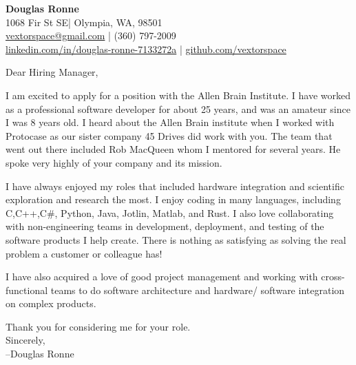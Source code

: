 \documentclass[letter,12pt]{article}
\begin{document}
\begin{center}
    {\Huge \textbf{Douglas Ronne}}\\
    \vspace{2mm}
    1068 Fir St SE| Olympia, WA, 98501\\
    \href{mailto:vextorspace@gmail.com}{vextorspace@gmail.com} | (360) 797-2009\\
    \href{www.linkedin.com/in/douglas-ronne-7133272a}{linkedin.com/in/douglas-ronne-7133272a} | \href{https://github.com/vextorspace}{github.com/vextorspace}
\end{center}

Dear Hiring Manager,

I am excited to apply for a position with the Allen Brain Institute. I have worked as a professional software developer for about 25 years, and was an amateur since I was 8 years old. I heard about the Allen Brain institute when I worked with Protocase as our sister company 45 Drives did work with you. The team that went out there included Rob MacQueen whom I mentored for several years. He spoke very highly of your company and its mission.

I have always enjoyed my roles that included hardware integration and scientific exploration and research the most. I enjoy coding in many languages, including C,C++,C\#, Python, Java, Jotlin, Matlab, and Rust. I also love collaborating with non-engineering teams in development, deployment, and testing of the software products I help create. There is nothing as satisfying as solving the real problem a customer or colleague has!

I have also acquired a love of good project management and working with cross-functional teams to do software architecture and hardware/ software integration on complex products.

Thank you for considering me for your role.
\\
Sincerely,\\
--Douglas Ronne
\end{document}

